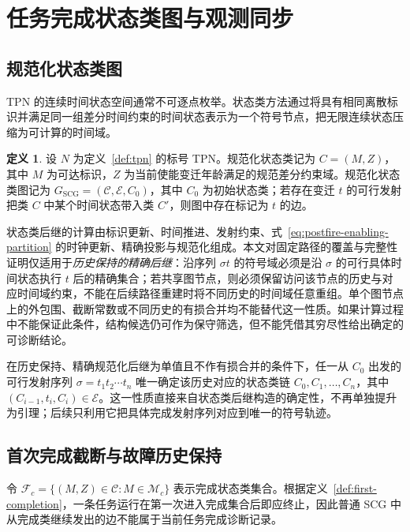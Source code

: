 \documentclass[master,fontset=ubuntu]{shnuthesis}
\theoremstyle{definition}
\newtheorem{thesisdefinition}{定义}
\begin{document}
\section{任务完成状态类图与观测同步}

\subsection{规范化状态类图}

TPN 的连续时间状态空间通常不可逐点枚举。状态类方法通过将具有相同离散标识并满足同一组差分时间约束的时间状态表示为一个符号节点，把无限连续状态压缩为可计算的时间域\cite{Basile2015,Basile2017}。

\begin{thesisdefinition}
\label{def:scg}
设 \(N\) 为定义~\ref{def:tpn} 的标号 TPN。规范化状态类记为 \(C=(M,Z)\)，其中 \(M\) 为可达标识，\(Z\) 为当前使能变迁年龄满足的规范差分约束域。规范化状态类图记为 \(G_{\mathrm{SCG}}=(\mathcal C,\mathcal E,C_0)\)，其中 \(C_0\) 为初始状态类；若存在变迁 \(t\) 的可行发射把类 \(C\) 中某个时间状态带入类 \(C'\)，则图中存在标记为 \(t\) 的边。
\end{thesisdefinition}

状态类后继的计算由标识更新、时间推进、发射约束、式~\eqref{eq:postfire-enabling-partition} 的时钟更新、精确投影与规范化组成。本文对固定路径的覆盖与完整性证明仅适用于\emph{历史保持的精确后继}：沿序列 $\sigma t$ 的符号域必须是沿 $\sigma$ 的可行具体时间状态执行 $t$ 后的精确集合；若共享图节点，则必须保留访问该节点的历史与对应时间域约束，不能在后续路径重建时将不同历史的时间域任意重组。单个图节点上的外包围、截断常数或不同历史的有损合并均不能替代这一性质。如果计算过程中不能保证此条件，结构候选仍可作为保守筛选，但不能凭借其穷尽性给出确定的可诊断结论。

在历史保持、精确规范化后继为单值且不作有损合并的条件下，任一从 \(C_0\) 出发的可行发射序列 \(\sigma=t_1t_2\cdots t_n\) 唯一确定该历史对应的状态类链 \(C_0,C_1,\ldots,C_n\)，其中 \((C_{i-1},t_i,C_i)\in\mathcal E\)。这一性质直接来自状态类后继构造的确定性，不再单独提升为引理；后续只利用它把具体完成发射序列对应到唯一的符号轨迹。

\subsection{首次完成截断与故障历史保持}

令 \(\mathcal F_c=\{(M,Z)\in\mathcal C:M\in\mathcal M_c\}\) 表示完成状态类集合。根据定义~\ref{def:first-completion}，一条任务运行在第一次进入完成集合后即应终止，因此普通 SCG 中从完成类继续发出的边不能属于当前任务完成诊断记录。
\end{document}

